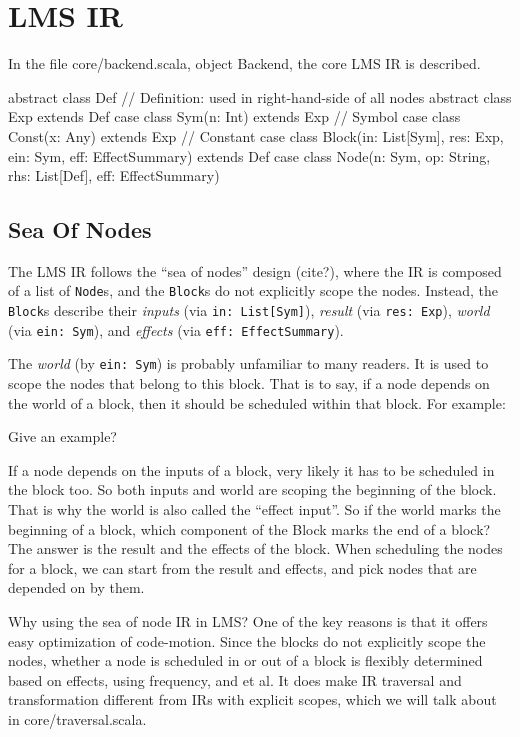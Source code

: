 \section{LMS IR}

In the file core/backend.scala, object Backend, the core LMS IR is described.

\begin{listing}[scala]
abstract class Def // Definition: used in right-hand-side of all nodes
abstract class Exp extends Def
case class Sym(n: Int) extends Exp   // Symbol
case class Const(x: Any) extends Exp // Constant
case class Block(in: List[Sym], res: Exp, ein: Sym, eff: EffectSummary) extends Def
case class Node(n: Sym, op: String, rhs: List[Def], eff: EffectSummary)
\end{listing}

\subsection{Sea Of Nodes}\label{sec:node}

The LMS IR follows the ``sea of nodes'' design (cite?), where the IR is composed of
a list of \texttt{Node}s, and the \texttt{Block}s do not explicitly scope the nodes.
Instead, the \texttt{Block}s describe their \emph{inputs} (via \texttt{in: List[Sym]}),
\emph{result} (via \texttt{res: Exp}), \emph{world} (via \texttt{ein: Sym}), and
\emph{effects} (via \texttt{eff: EffectSummary}).

The \emph{world} (by \texttt{ein: Sym}) is probably unfamiliar to many readers. It is
used to scope the nodes that belong to this block. That is to say, if a node depends on
the world of a block, then it should be scheduled within that block. For example:

\begin{listing}[scala]
Give an example?
\end{listing}

If a node depends on the inputs of a block, very likely it has to be scheduled in the block
too. So both inputs and world are scoping the beginning of the block. That is why the world
is also called the ``effect input''.
So if the world marks the beginning of a block, which component of the Block marks the
end of a block? The answer is the result and the effects of the block. When scheduling the
nodes for a block, we can start from the result and effects, and pick nodes that are depended
on by them.

Why using the sea of node IR in LMS? One of the key reasons is that it offers easy
optimization of code-motion. Since the blocks do not explicitly scope the nodes, whether
a node is scheduled in or out of a block is flexibly determined based on effects, using
frequency, and et al. It does make IR traversal and transformation different from IRs with
explicit scopes, which we will talk about in core/traversal.scala.

